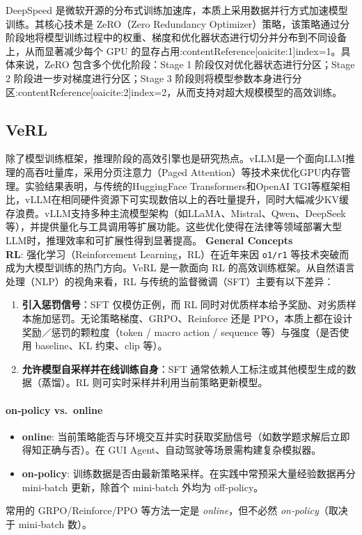 \documentclass{pkuthesis}
\begin{document}
DeepSpeed 是微软开源的分布式训练加速库，本质上采用数据并行方式加速模型训练。其核心技术是 ZeRO（Zero Redundancy Optimizer）策略，该策略通过分阶段地将模型训练过程中的权重、梯度和优化器状态进行切分并分布到不同设备上，从而显著减少每个 GPU 的显存占用:contentReference[oaicite:1]{index=1}。具体来说，ZeRO 包含多个优化阶段：Stage 1 阶段仅对优化器状态进行分区；Stage 2 阶段进一步对梯度进行分区；Stage 3 阶段则将模型参数本身进行分区:contentReference[oaicite:2]{index=2}，从而支持对超大规模模型的高效训练。




\subsection{VeRL}
除了模型训练框架，推理阶段的高效引擎也是研究热点。vLLM是一个面向LLM推理的高吞吐量库，采用分页注意力（Paged Attention）等技术来优化GPU内存管理。实验结果表明，与传统的HuggingFace Transformers和OpenAI TGI等框架相比，vLLM在相同硬件资源下可实现数倍以上的吞吐量提升，同时大幅减少KV缓存浪费。vLLM支持多种主流模型架构（如LLaMA、Mistral、Qwen、DeepSeek等），并提供量化与工具调用等扩展功能。这些优化使得在法律等领域部署大型LLM时，推理效率和可扩展性得到显著提高。
\textbf{General Concepts}\\
\textbf{RL}: 强化学习（Reinforcement Learning，RL）在近年来因 \texttt{o1/r1} 等技术突破而成为大模型训练的热门方向。VeRL 是一款面向 RL 的高效训练框架。从自然语言处理（NLP）的视角来看，RL 与传统的监督微调（SFT）主要有以下差异：
\begin{enumerate}
    \item \textbf{引入惩罚信号}：SFT 仅模仿正例，而 RL 同时对优质样本给予奖励、对劣质样本施加惩罚。无论策略梯度、GRPO、Reinforce 还是 PPO，本质上都在设计奖励／惩罚的颗粒度（token / macro action / sequence 等）与强度（是否使用 baseline、KL 约束、clip 等）。
    \item \textbf{允许模型自采样并在线训练自身}：SFT 通常依赖人工标注或其他模型生成的数据（蒸馏）。RL 则可实时采样并利用当前策略更新模型。
\end{enumerate}

\paragraph{on‐policy vs.\ online}
\begin{itemize}
    \item \textbf{online}: 当前策略能否与环境交互并实时获取奖励信号（如数学题求解后立即得知正确与否）。在 GUI Agent、自动驾驶等场景需构建复杂模拟器。
    \item \textbf{on‐policy}: 训练数据是否由最新策略采样。在实践中常预采大量经验数据再分 mini‐batch 更新，除首个 mini‐batch 外均为 off‐policy。
\end{itemize}
常用的 GRPO/Reinforce/PPO 等方法一定是 \emph{online}，但不必然 \emph{on‐policy}（取决于 mini‐batch 数）。
\end{document}
